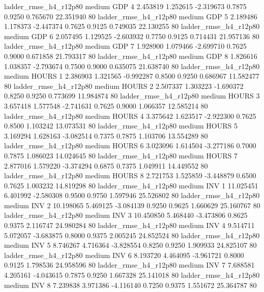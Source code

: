  ladder_rmse_h4_r12p80     medium      GDP                 4  2.453819 1.252615 -2.319673 0.7875 0.9250  0.765670   22.351940 80
 ladder_rmse_h4_r12p80     medium      GDP                 5  2.189486 1.178373 -2.447374 0.7625 0.9125  0.749035   22.130255 80
 ladder_rmse_h4_r12p80     medium      GDP                 6  2.057495 1.129525 -2.603932 0.7750 0.9125  0.714431   21.957136 80
 ladder_rmse_h4_r12p80     medium      GDP                 7  1.928900 1.079466 -2.699710 0.7625 0.9000  0.671858   21.793317 80
 ladder_rmse_h4_r12p80     medium      GDP                 8  1.826616 1.038357 -2.793674 0.7500 0.9000  0.635075   21.638740 80
 ladder_rmse_h4_r12p80     medium    HOURS                 1  2.386903 1.321565 -0.992287 0.8500 0.9250  0.686967   11.582477 80
 ladder_rmse_h4_r12p80     medium    HOURS                 2  2.507337 1.303223 -1.690372 0.8250 0.9250  0.773699   11.984874 80
 ladder_rmse_h4_r12p80     medium    HOURS                 3  3.657418 1.577548 -2.741631 0.7625 0.9000  1.066357   12.585214 80
 ladder_rmse_h4_r12p80     medium    HOURS                 4  3.375642 1.623517 -2.922300 0.7625 0.8500  1.103242   13.073531 80
 ladder_rmse_h4_r12p80     medium    HOURS                 5  3.169294 1.628163 -3.082514 0.7375 0.7875  1.103706   13.554289 80
 ladder_rmse_h4_r12p80     medium    HOURS                 6  3.023096 1.614504 -3.277186 0.7000 0.7875  1.086023   14.024645 80
 ladder_rmse_h4_r12p80     medium    HOURS                 7  2.877016 1.579220 -3.374294 0.6875 0.7375  1.049911   14.449552 80
 ladder_rmse_h4_r12p80     medium    HOURS                 8  2.721753 1.525859 -3.448879 0.6500 0.7625  1.003232   14.819298 80
 ladder_rmse_h4_r12p80     medium      INV                 1 11.025451 6.401992 -2.580308 0.9500 0.9750  1.597946   25.526802 80
 ladder_rmse_h4_r12p80     medium      INV                 2 10.198065 5.469125 -3.084139 0.9250 0.9625  1.660629   25.160767 80
 ladder_rmse_h4_r12p80     medium      INV                 3 10.450850 5.468440 -3.473806 0.8625 0.9375  2.116747   24.980284 80
 ladder_rmse_h4_r12p80     medium      INV                 4  9.514711 5.072057 -3.683875 0.8000 0.9375  2.005245   24.852524 80
 ladder_rmse_h4_r12p80     medium      INV                 5  8.746267 4.716364 -3.828554 0.8250 0.9250  1.909933   24.825107 80
 ladder_rmse_h4_r12p80     medium      INV                 6  8.193720 4.464095 -3.961721 0.8000 0.9125  1.798536   24.958596 80
 ladder_rmse_h4_r12p80     medium      INV                 7  7.688581 4.205161 -4.043615 0.7875 0.9250  1.667328   25.141018 80
 ladder_rmse_h4_r12p80     medium      INV                 8  7.239838 3.971386 -4.116140 0.7250 0.9375  1.551672   25.364787 80
